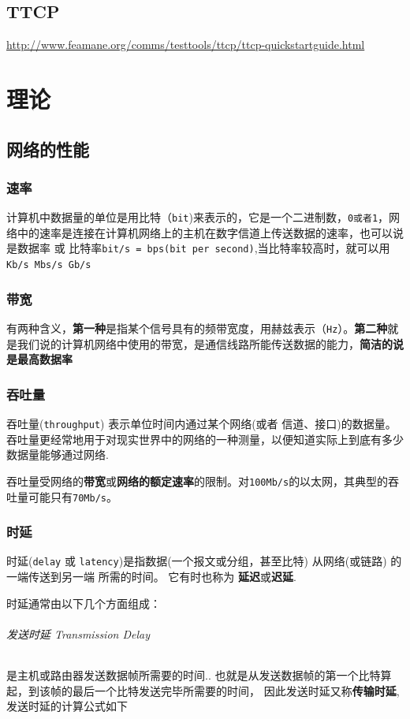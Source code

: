 \documentclass[UTF8,a4paper,8pt]{ctexbook}
\begin{document}
	\section{TTCP}
		\url{http://www.feamane.org/comms/testtools/ttcp/ttcp-quickstartguide.html}
	
\chapter{理论}
	\section{网络的性能}
		\subsection{速率} 计算机中数据量的单位是用比特（\verb|bit|)来表示的，它是一个二进制数，\verb|0或者1|，网络中的速率是连接在计算机网络上的主机在数字信道上传送数据的速率，也可以说是数据率 或 比特率\verb|bit/s = bps(bit per second)|,当比特率较高时，就可以用\verb|Kb/s Mbs/s Gb/s|
		
		\subsection{带宽} 有两种含义，\textbf{第一种}是指某个信号具有的频带宽度，用赫兹表示（\verb|Hz|）。\textbf{第二种}就是我们说的计算机网络中使用的带宽，是通信线路所能传送数据的能力，\textbf{简洁的说是最高数据率}
		
		\subsection{吞吐量} 吞吐量(\verb|throughput|) 表示单位时间内通过某个网络(或者 信道、接口)的数据量。 吞吐量更经常地用于对现实世界中的网络的一种测量，以便知道实际上到底有多少数据量能够通过网络.
		
			吞吐量受网络的\textbf{带宽}或\textbf{网络的额定速率}的限制。对\verb|100Mb/s|的以太网，其典型的吞吐量可能只有\verb|70Mb/s|。
			
		\subsection{时延} 时延(\verb|delay| 或 \verb|latency|)是指数据(一个报文或分组，甚至比特) 从网络(或链路) 的一端传送到另一端 所需的时间。 它有时也称为 \textbf{延迟}或\textbf{迟延}.
			
			时延通常由以下几个方面组成：
			\subparagraph{发送时延 Transmission Delay} 是主机或路由器发送数据帧所需要的时间.. 也就是从发送数据帧的第一个比特算起，到该帧的最后一个比特发送完毕所需要的时间， 因此发送时延又称\textbf{传输时延},发送时延的计算公式如下
			
\end{document}
